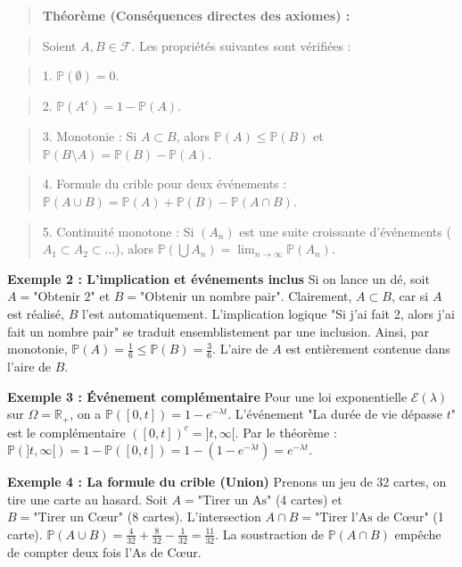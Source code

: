 \documentclass[11pt,a4paper]{article}
\begin{document}
\begin{quote}\textbf{Théorème (Conséquences directes des axiomes) :}\end{quote}
\begin{quote}Soient $A, B \in \mathcal{F}$. Les propriétés suivantes sont vérifiées :\end{quote}
\begin{quote}1. $\mathbb{P}(\emptyset) = 0$.\end{quote}
\begin{quote}2. $\mathbb{P}(A^c) = 1 - \mathbb{P}(A)$.\end{quote}
\begin{quote}3. Monotonie : Si $A \subset B$, alors $\mathbb{P}(A) \le \mathbb{P}(B)$ et $\mathbb{P}(B \setminus A) = \mathbb{P}(B) - \mathbb{P}(A)$.\end{quote}
\begin{quote}4. Formule du crible pour deux événements : $\mathbb{P}(A \cup B) = \mathbb{P}(A) + \mathbb{P}(B) - \mathbb{P}(A \cap B)$.\end{quote}
\begin{quote}5. Continuité monotone : Si $(A_n)$ est une suite croissante d'événements ($A_1 \subset A_2 \subset \dots$), alors $\mathbb{P}(\bigcup A_n) = \lim_{n \to \infty} \mathbb{P}(A_n)$.\end{quote}

\textbf{Exemple 2 : L'implication et événements inclus}
Si on lance un dé, soit $A = \text{"Obtenir 2"}$ et $B = \text{"Obtenir un nombre pair"}$.
Clairement, $A \subset B$, car si $A$ est réalisé, $B$ l'est automatiquement. L'implication logique "Si j'ai fait 2, alors j'ai fait un nombre pair" se traduit ensemblistement par une inclusion.
Ainsi, par monotonie, $\mathbb{P}(A) = \frac{1}{6} \le \mathbb{P}(B) = \frac{3}{6}$. L'aire de $A$ est entièrement contenue dans l'aire de $B$.

\textbf{Exemple 3 : Événement complémentaire}
Pour une loi exponentielle $\mathcal{E}(\lambda)$ sur $\Omega = \mathbb{R}_+$, on a $\mathbb{P}([0, t]) = 1 - e^{-\lambda t}$.
L'événement "La durée de vie dépasse $t$" est le complémentaire $([0, t])^c = ]t, \infty[$.
Par le théorème : $\mathbb{P}(]t, \infty[) = 1 - \mathbb{P}([0, t]) = 1 - (1 - e^{-\lambda t}) = e^{-\lambda t}$.

\textbf{Exemple 4 : La formule du crible (Union)}
Prenons un jeu de 32 cartes, on tire une carte au hasard.
Soit $A = \text{"Tirer un As"}$ (4 cartes) et $B = \text{"Tirer un Cœur"}$ (8 cartes).
L'intersection $A \cap B = \text{"Tirer l'As de Cœur"}$ (1 carte).
$\mathbb{P}(A \cup B) = \frac{4}{32} + \frac{8}{32} - \frac{1}{32} = \frac{11}{32}$.
La soustraction de $\mathbb{P}(A \cap B)$ empêche de compter deux fois l'As de Cœur.
\end{document}
